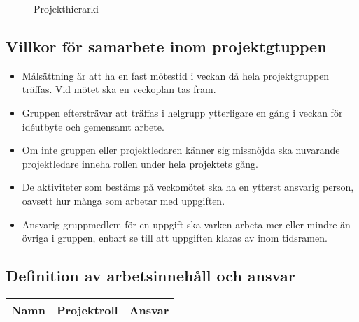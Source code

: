 \documentclass[11pt]{article}
\begin{document}
\begin{flushleft}
\begin{figure}[htbp]
\caption{Projekthierarki} \label{hierarki}

\end{figure}

\subsection{Villkor för samarbete inom projektgtuppen}
\begin{itemize}
	\item Målsättning är att ha en fast mötestid i veckan då hela projektgruppen träffas. Vid mötet ska en veckoplan tas fram.
	\item Gruppen eftersträvar att träffas i helgrupp ytterligare en gång i veckan för idéutbyte och gemensamt arbete.
	\item Om inte gruppen eller projektledaren känner sig missnöjda ska nuvarande projektledare inneha rollen under hela projektets gång.
	\item De aktiviteter som bestäms på veckomötet ska ha en ytterst ansvarig person, oavsett hur många som arbetar med uppgiften.
	\item Ansvarig gruppmedlem för en uppgift ska varken arbeta mer eller mindre än övriga i gruppen, enbart se till att uppgiften klaras av inom tidsramen.
\end{itemize}

\subsection{Definition av arbetsinnehåll och ansvar}

\begin{longtable}{| p{.2\linewidth} | p{.2\linewidth} | p{.5\linewidth} |} \hline
\textbf{Namn} & \textbf{Projektroll} & \textbf{Ansvar} \\ \hline \endhead


\end{longtable}
\end{flushleft}
\end{document}
